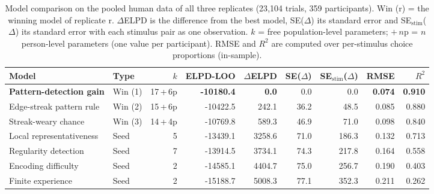 \begin{table}[t]
\small
\centering
\caption{Model comparison on the pooled human data of all three replicates (23{,}104 trials, 359 participants). Win (r) = the winning model of replicate r. $\Delta$ELPD is the difference from the best model, SE($\Delta$) its standard error and SE$_\mathrm{stim}$($\Delta$) its standard error with each stimulus pair as one observation. $k$ = free population-level parameters; $+\,n$p = $n$ person-level parameters (one value per participant). RMSE and $R^2$ are computed over per-stimulus choice proportions (in-sample).}
\label{tab:mega-comparison}
\begin{tabular}{llrrrrrrr}
  \toprule
  Model & Type & $k$ & ELPD-LOO & $\Delta$ELPD & SE($\Delta$) & SE$_\mathrm{stim}$($\Delta$) & RMSE & $R^2$ \\
  \midrule
  {\bf Pattern-detection gain} & Win (1) & 17\,+\,6p & {\bf -10180.4} & {\bf 0.0} & 0.0 & 0.0 & {\bf 0.074} & {\bf 0.910} \\
  Edge-streak pattern rule & Win (2) & 15\,+\,6p & -10422.5 & 242.1 & 36.2 & 48.5 & 0.085 & 0.880 \\
  Streak-weary chance & Win (3) & 14\,+\,4p & -10769.8 & 589.3 & 46.9 & 71.0 & 0.098 & 0.840 \\
  Local representativeness & Seed & 5 & -13439.1 & 3258.6 & 71.0 & 186.3 & 0.132 & 0.713 \\
  Regularity detection & Seed & 7 & -13914.5 & 3734.1 & 74.3 & 217.8 & 0.164 & 0.558 \\
  Encoding difficulty & Seed & 2 & -14585.1 & 4404.7 & 75.0 & 256.7 & 0.190 & 0.403 \\
  Finite experience & Seed & 2 & -15188.7 & 5008.3 & 77.1 & 352.3 & 0.211 & 0.262 \\
  \bottomrule
\end{tabular}
\end{table}
